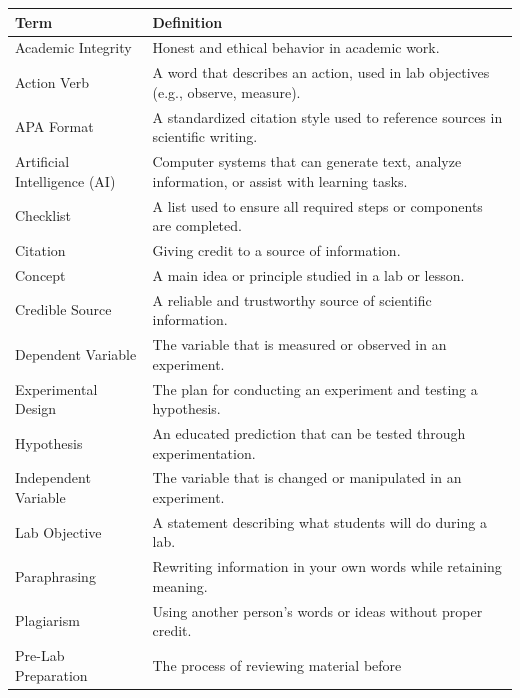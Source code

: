 \documentclass[
  letterpaper,
  DIV=11,
  numbers=noendperiod]{scrreprt}
\newcounter{none} %
\begin{document}
{\def\LTcaptype{none} %
\begin{longtable}[]{@{}
  >{\raggedright\arraybackslash}p{}
  >{\raggedright\arraybackslash}p{}@{}}
\toprule\noalign{}
\begin{minipage}[b]{\linewidth}\raggedright
\textbf{Term}
\end{minipage} & \begin{minipage}[b]{\linewidth}\raggedright
\textbf{Definition}
\end{minipage} \\
\midrule\noalign{}
\endhead
\bottomrule\noalign{}
\endlastfoot
Academic Integrity & Honest and ethical behavior in academic work. \\
Action Verb & A word that describes an action, used in lab objectives
(e.g., observe, measure). \\
APA Format & A standardized citation style used to reference sources in
scientific writing. \\
Artificial Intelligence (AI) & Computer systems that can generate text,
analyze information, or assist with learning tasks. \\
Checklist & A list used to ensure all required steps or components are
completed. \\
Citation & Giving credit to a source of information. \\
Concept & A main idea or principle studied in a lab or lesson. \\
Credible Source & A reliable and trustworthy source of scientific
information. \\
Dependent Variable & The variable that is measured or observed in an
experiment. \\
Experimental Design & The plan for conducting an experiment and testing
a hypothesis. \\
Hypothesis & An educated prediction that can be tested through
experimentation. \\
Independent Variable & The variable that is changed or manipulated in an
experiment. \\
Lab Objective & A statement describing what students will do during a
lab. \\
Paraphrasing & Rewriting information in your own words while retaining
meaning. \\
Plagiarism & Using another person's words or ideas without proper
credit. \\
Pre-Lab Preparation & The process of reviewing material before

\end{longtable}}
\end{document}
